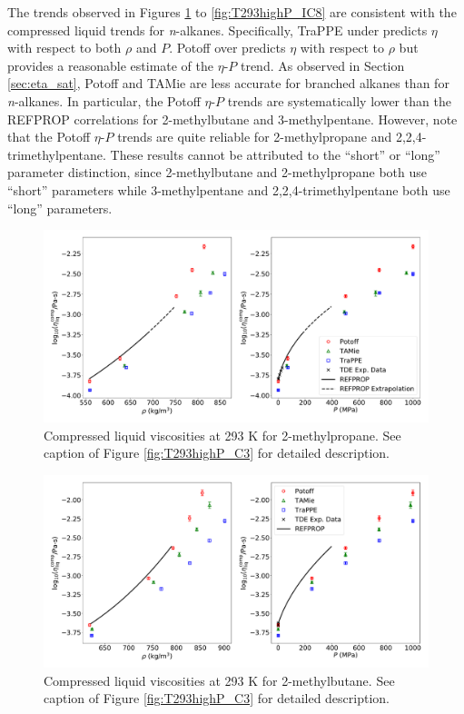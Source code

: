 \documentclass[preprint,review,12pt]{elsarticle}
\begin{document}
   The trends observed in Figures \ref{fig:T293highP_IC4} to \ref{fig:T293highP_IC8} are consistent with the compressed liquid trends for \textit{n}-alkanes. Specifically, TraPPE under predicts $\eta$ with respect to both $\rho$ and $P$. Potoff over predicts $\eta$ with respect to $\rho$ but provides a reasonable estimate of the $\eta$-$P$ trend. As observed in Section \ref{sec:eta_sat}, Potoff and TAMie are less accurate for branched alkanes than for \textit{n}-alkanes. In particular, the Potoff $\eta$-$P$ trends are systematically lower than the REFPROP correlations for 2-methylbutane and 3-methylpentane. However, note that the Potoff $\eta$-$P$ trends are quite reliable for 2-methylpropane and 2,2,4-trimethylpentane. These results cannot be attributed to the ``short'' or ``long'' parameter distinction, since 2-methylbutane and 2-methylpropane both use ``short'' parameters while 3-methylpentane and 2,2,4-trimethylpentane both use ``long'' parameters. 
	
	\begin{figure}[htb!]
		\centering
		\includegraphics[width=6.4in]{compare_REFPROP_T293highP_IC4H10.pdf}
		\caption{Compressed liquid viscosities at 293 K for 2-methylpropane. See caption of Figure \ref{fig:T293highP_C3} for detailed description.}
		\label{fig:T293highP_IC4}
	\end{figure} 
	
	\begin{figure}[htb!]
		\centering
		\includegraphics[width=6.4in]{compare_REFPROP_T293highP_IC5H12.pdf}
		\caption{Compressed liquid viscosities at 293 K for 2-methylbutane. See caption of Figure \ref{fig:T293highP_C3} for detailed description.}
		\label{fig:T293highP_IC5}
	\end{figure} 
	
\end{document}

